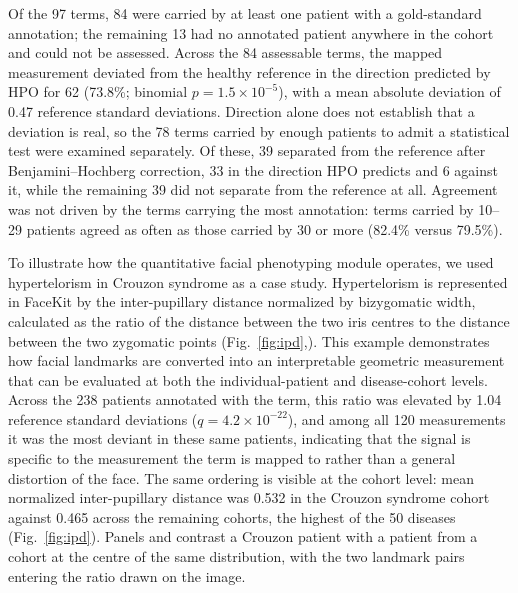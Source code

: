 \documentclass[11pt]{article}
\begin{document}
Of the 97 terms, 84 were carried by at least one patient with a gold-standard
annotation; the remaining 13 had no annotated patient anywhere in the cohort and
could not be assessed. Across the 84 assessable terms, the mapped measurement
deviated from the healthy reference in the direction predicted by HPO for 62
(73.8\%; binomial $p=1.5\times10^{-5}$), with a mean absolute deviation of 0.47
reference standard deviations. Direction alone does not establish that a deviation is real, so the 78 terms
carried by enough patients to admit a statistical test were examined separately.
Of these, 39 separated from the reference after Benjamini--Hochberg correction,
33 in the direction HPO predicts and 6 against it, while the remaining 39 did
not separate from the reference at all. Agreement was not driven by the terms
carrying the most annotation: terms carried by 10--29 patients agreed as often
as those carried by 30 or more (82.4\% versus 79.5\%).

To illustrate how the quantitative facial phenotyping module operates, we used hypertelorism in Crouzon syndrome as a case study. Hypertelorism is represented in FaceKit by the inter-pupillary distance normalized by bizygomatic width, calculated as the ratio of the distance between the two iris centres to the distance between the two zygomatic points (Fig.~\ref{fig:ipd},). This example demonstrates how facial landmarks are converted into an interpretable geometric measurement that can be evaluated at both the individual-patient and disease-cohort levels. Across the 238 patients annotated with the term,
this ratio was elevated by 1.04 reference standard deviations
($q=4.2\times10^{-22}$), and among all 120 measurements it was the most
deviant in these same patients, indicating that the signal is specific to the
measurement the term is mapped to rather than a general distortion of the face.
The same ordering is visible at the cohort level: mean normalized inter-pupillary
distance was 0.532 in the Crouzon syndrome cohort against 0.465 across the
remaining cohorts, the highest of the 50 diseases (Fig.~\ref{fig:ipd}). Panels  and  contrast a Crouzon patient with a patient from a cohort at the centre of the same
distribution, with the two landmark pairs entering the ratio drawn on the image.
\end{document}
